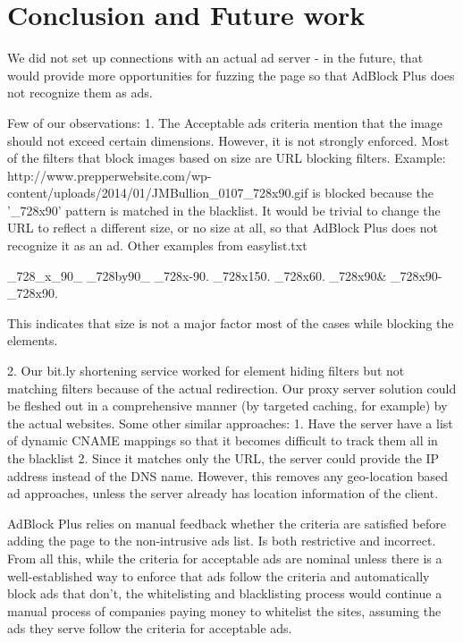 \section{Conclusion and Future work}\label{sec:conclusions}

We did not set up connections with an actual ad server - in the future, that would provide more opportunities for fuzzing the page so that AdBlock Plus does not recognize them as ads.

Few of our observations:
1. The Acceptable ads criteria mention that the image should not exceed certain dimensions. However, it is not strongly enforced. Most of the filters that block images based on size are URL blocking filters. Example: http://www.prepperwebsite.com/wp-content/uploads/2014/01/JMBullion_0107_728x90.gif is blocked because the '_728x90' pattern is matched in the blacklist. It would be trivial to change the URL to reflect a different size, or no size at all, so that AdBlock Plus does not recognize it as an ad. Other examples from easylist.txt

_728_x_90_
_728by90_
_728x-90.
_728x150.
_728x60.
_728x90&
_728x90-
_728x90.

This indicates that size is not a major factor most of the cases while blocking the elements.

2. Our bit.ly shortening service worked for element hiding filters but not matching filters because of the actual redirection. Our proxy server solution could be fleshed out in a comprehensive manner (by targeted caching, for example) by the actual websites. Some other similar approaches:
1. Have the server have a list of dynamic CNAME mappings so that it becomes difficult to track them all in the blacklist
2. Since it matches only the URL, the server could provide the IP address instead of the DNS name. However, this removes any geo-location based ad approaches, unless the server already has location information of the client.

AdBlock Plus relies on manual feedback whether the criteria are satisfied before adding the page to the non-intrusive ads list.
Is both restrictive and incorrect. From all this, while the criteria for acceptable ads are nominal unless there is a well-established way to enforce that ads follow the criteria and automatically block ads that don't, the whitelisting and blacklisting process would continue a manual process of companies paying money to whitelist the sites, assuming the ads they serve follow the criteria for acceptable ads.



